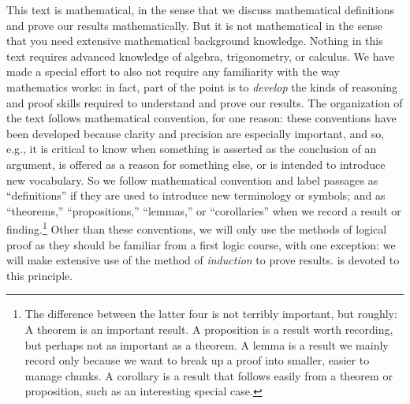 This text is mathematical, in the sense that we discuss mathematical
definitions and prove our results mathematically.  But it is not
mathematical in the sense that you need extensive mathematical
background knowledge.  Nothing in this text requires advanced
knowledge of algebra, trigonometry, or calculus.  We have made a
special effort to also not require any familiarity with the way
mathematics works: in fact, part of the point is to \emph{develop} the
kinds of reasoning and proof skills required to understand and prove
our results.  The organization of the text follows mathematical
convention, for one reason: these conventions have been developed
because clarity and precision are especially important, and so, e.g.,
it is critical to know when something is asserted as the conclusion of
an argument, is offered as a reason for something else, or is intended
to introduce new vocabulary. So we follow mathematical convention and
label passages as ``definitions'' if they are used to introduce new
terminology or symbols; and as ``theorems,'' ``propositions,''
``lemmas,'' or ``corollaries'' when we record a result or
finding.\footnote{The difference between the latter four is not
  terribly important, but roughly: A theorem is an important result. A
  proposition is a result worth recording, but perhaps not as
  important as a theorem. A lemma is a result we mainly record only
  because we want to break up a proof into smaller, easier to manage
  chunks.  A corollary is a result that follows easily from a theorem
  or proposition, such as an interesting special case.}  Other than
these conventions, we will only use the methods of logical proof as
they should be familiar from a first logic course, with one exception:
we will make extensive use of the method of \emph{induction} to prove
results.   is devoted to this principle.

